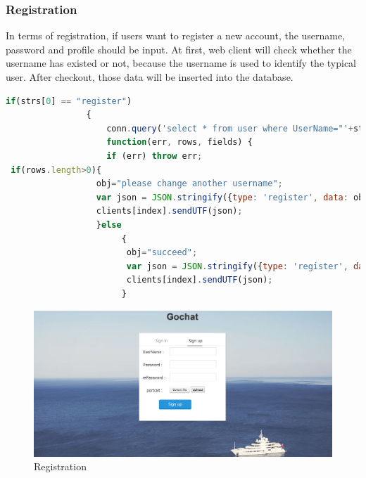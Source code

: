 \documentclass[a4paper,11pt]{article}
\begin{document}
\subsubsection*{Registration}
In terms of registration, if users want to register a new account, the username, password and profile should be input. At first, web client will check whether the username has existed or not, because the username is used to identify the typical user. After checkout, those data will be inserted into the database.
\begin{lstlisting}[language=javascript]
 if(strs[0] == "register")
                {
                    conn.query('select * from user where UserName="'+strs[1]+'"',
                    function(err, rows, fields) {
                    if (err) throw err;
 if(rows.length>0){
                  obj="please change another username";
                  var json = JSON.stringify({type: 'register', data: obj});
                  clients[index].sendUTF(json);
                  }else
                       {
                        obj="succeed";
                        var json = JSON.stringify({type: 'register', data: obj});
                        clients[index].sendUTF(json);
                       }
\end{lstlisting}
\begin{figure}[!h]
\centering
\includegraphics[width = 0.9 \textwidth ]{register.png}
\caption{\label{fig:UML}Registration}
\end{figure}
\end{document}
